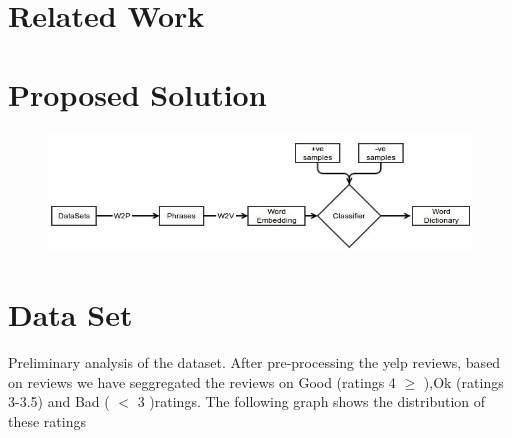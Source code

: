 \documentclass{article} %
\begin{document}
\begin{abstract}


\end{abstract}


\section{Related Work}



\section{Proposed Solution}


\begin{figure}[h]
  \begin{center}
    \includegraphics[scale=0.6]{ml.jpg}
    \label{fig:1}
    \caption{}
  \end{center}
\end{figure}


\section{Data Set}

Preliminary analysis of the dataset. After pre-processing the yelp reviews, based on reviews we have seggregated the reviews on Good (ratings 4 $\geq$  ),Ok (ratings 3-3.5) and Bad ( $<$ 3 )ratings. The following graph shows the distribution of these ratings
\end{document}
